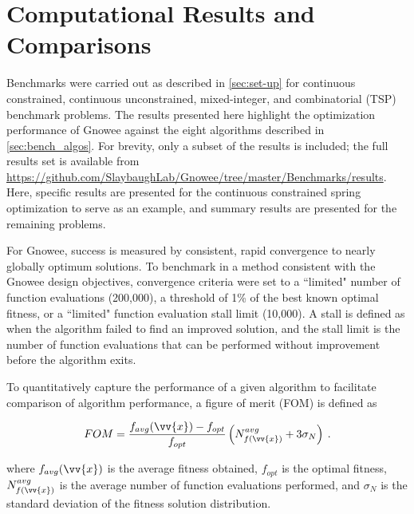 \documentclass{article}                                                                           %
\begin{document}
\section{Computational Results and Comparisons} \label{sec:results}
Benchmarks were carried out as described in \autoref{sec:set-up} for continuous constrained, continuous unconstrained, mixed-integer, and combinatorial (TSP) benchmark problems.  
The results presented here highlight the optimization performance of Gnowee against the eight algorithms described in \autoref{sec:bench_algos}.  
For brevity, only a subset of the results is included; the full results set is available from \url{https://github.com/SlaybaughLab/Gnowee/tree/master/Benchmarks/results}. 
Here, specific results are presented for the continuous constrained spring optimization to serve as an example, and summary results are presented for the remaining problems.  

For Gnowee, success is measured by consistent, rapid convergence to nearly globally optimum solutions.  
To benchmark in a method consistent with the Gnowee design objectives, convergence criteria were set to a ``limited" number of function evaluations (200,000), a threshold of 1\% of the best known optimal fitness, or a ``limited" function evaluation stall limit (10,000).   
A stall is defined as when the algorithm failed to find an improved solution, and the stall limit is the number of function evaluations that can be performed without improvement before the algorithm exits.

To quantitatively capture the performance of a given algorithm to facilitate comparison of algorithm performance, a figure of merit (FOM) is defined as

\begin{equation} \label{eq:fom}
  FOM = \frac{f_{avg}(\vv{x})-f_{opt}}{f_{opt}} \left(N^{avg}_{f(\vv{x})} + 3 \sigma_{N} \right)\:.
\end{equation}

\noindent where $f_{avg}(\vv{x})$ is the average fitness obtained, $f_{opt}$ is the optimal fitness, $N^{avg}_{f(\vv{x})}$ is the average number of function evaluations performed, and $\sigma_{N}$ is the standard deviation of the fitness solution distribution.
\end{document}
